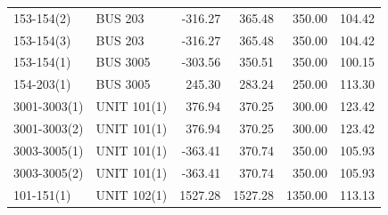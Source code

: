 \documentclass[10pt]{report}
\begin{document}
\begin{table}[H]
{\begin{tabular}{llrrrr}
153-154(2) & BUS 203 & -316.27 & 365.48 & 350.00 & 104.42 \\
153-154(3) & BUS 203 & -316.27 & 365.48 & 350.00 & 104.42 \\
153-154(1) & BUS 3005 & -303.56 & 350.51 & 350.00 & 100.15 \\
154-203(1) & BUS 3005 & 245.30 & 283.24 & 250.00 & 113.30 \\
3001-3003(1) & UNIT 101(1) & 376.94 & 370.25 & 300.00 & 123.42 \\
3001-3003(2) & UNIT 101(1) & 376.94 & 370.25 & 300.00 & 123.42 \\
3003-3005(1) & UNIT 101(1) & -363.41 & 370.74 & 350.00 & 105.93 \\
3003-3005(2) & UNIT 101(1) & -363.41 & 370.74 & 350.00 & 105.93 \\
101-151(1) & UNIT 102(1) & 1527.28 & 1527.28 & 1350.00 & 113.13 \\
\bottomrule
\end{tabular}}
\end{table}
\end{document}

